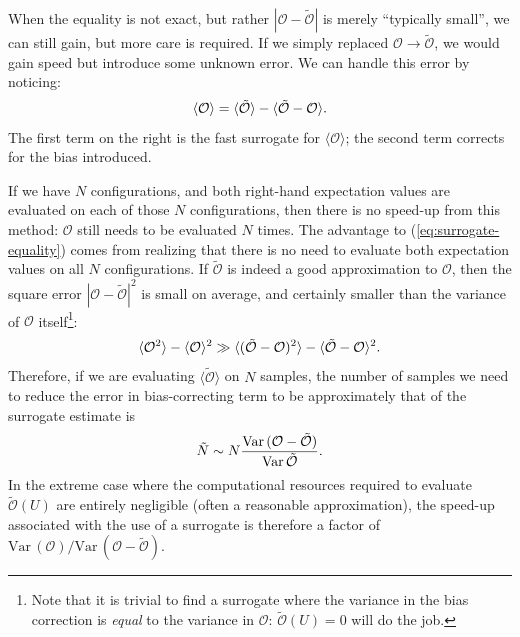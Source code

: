 \documentclass[12pt]{article}
\begin{document}
When the equality is not exact, but rather $|\mathcal O - \tilde{\mathcal O}|$ is merely ``typically small'', we can still gain, but more care is required. If we simply replaced $\mathcal O \rightarrow \tilde{\mathcal O}$, we would gain speed but introduce some unknown error. We can handle this error by noticing:
\begin{equation}\label{eq:surrogate-equality}
    \langle \mathcal O \rangle = \langle \tilde{\mathcal O} \rangle - \langle \tilde{\mathcal O} - \mathcal O \rangle
    \text.
\end{equation}
The first term on the right is the fast surrogate for $\langle \mathcal O\rangle$; the second term corrects for the bias introduced.

If we have $N$ configurations, and both right-hand expectation values are evaluated on each of those $N$ configurations, then there is no speed-up from this method: $\mathcal O$ still needs to be evaluated $N$ times. The advantage to (\ref{eq:surrogate-equality}) comes from realizing that there is no need to evaluate both expectation values on all $N$ configurations. If $\tilde{\mathcal O}$ is indeed a good approximation to $\mathcal O$, then the square error $|\mathcal O - \tilde{\mathcal O}|^2$ is small on average, and certainly smaller than the variance of $\mathcal O$ itself\footnote{Note that it is trivial to find a surrogate where the variance in the bias correction is \emph{equal} to the variance in $\mathcal O$: $\tilde{\mathcal O}(U) = 0$ will do the job.}:
\begin{equation}
    \langle \mathcal O^2\rangle
    -\langle \mathcal O\rangle^2
    \gg
    \langle (\tilde{\mathcal O} - \mathcal O)^2\rangle
    -
    \langle \tilde{\mathcal O} - \mathcal O\rangle^2
    \text.
\end{equation}
Therefore, if we are evaluating $\langle \tilde{\mathcal O}\rangle$ on $N$ samples, the number of samples we need to reduce the error in bias-correcting term to be approximately that of the surrogate estimate is
\begin{equation}
\tilde N \sim N \frac{\mathrm{Var}\,({\mathcal O} - \tilde{\mathcal O})}{\mathrm{Var}\,\tilde{\mathcal O}}
    \text.
\end{equation}
In the extreme case where the computational resources required to evaluate $\tilde{\mathcal O}(U)$ are entirely negligible (often a reasonable approximation), the speed-up associated with the use of a surrogate is therefore a factor of $\mathrm{Var}\,(\mathcal O) / \mathrm{Var}\,(\mathcal O - \tilde{\mathcal O})$.
\end{document}
